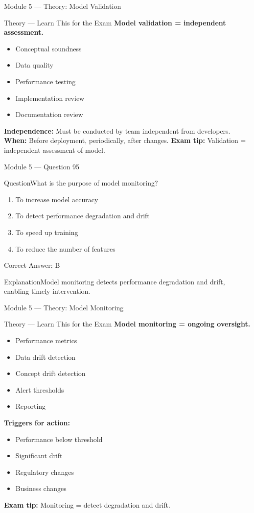 \documentclass[aspectratio=169,10pt]{beamer}
\newcommand{\question}[1]{\begin{block}{Question}#1\end{block}}
\newcommand{\options}[4]{%
	\begin{enumerate}[label=\Alph*.,leftmargin=*]
		\item #1
		\item #2
		\item #3
		\item #4
	\end{enumerate}
}
\newcommand{\answerbox}[1]{\begin{exampleblock}{Correct Answer: #1}\end{exampleblock}}
\newcommand{\explain}[1]{\begin{block}{Explanation}#1\end{block}}
\newcommand{\theory}[1]{%
	\begin{block}{Theory --- Learn This for the Exam}
		\small #1
	\end{block}
}
\begin{document}
	\begin{frame}{Module 5 --- Theory: Model Validation}
		\theory{
			\textbf{Model validation = independent assessment.}
			\begin{itemize}
				\item Conceptual soundness
				\item Data quality
				\item Performance testing
				\item Implementation review
				\item Documentation review
			\end{itemize}
			\textbf{Independence:} Must be conducted by team independent from developers.
			\textbf{When:} Before deployment, periodically, after changes.
			\textbf{Exam tip:} Validation = independent assessment of model.
		}
	\end{frame}
	
	\begin{frame}{Module 5 --- Question 95}
		\question{What is the purpose of model monitoring?}
		\options{To increase model accuracy}{To detect performance degradation and drift}{To speed up training}{To reduce the number of features}
		\answerbox{B}
		\explain{Model monitoring detects performance degradation and drift, enabling timely intervention.}
	\end{frame}
	
	\begin{frame}{Module 5 --- Theory: Model Monitoring}
		\theory{
			\textbf{Model monitoring = ongoing oversight.}
			\begin{itemize}
				\item Performance metrics
				\item Data drift detection
				\item Concept drift detection
				\item Alert thresholds
				\item Reporting
			\end{itemize}
			\textbf{Triggers for action:}
			\begin{itemize}
				\item Performance below threshold
				\item Significant drift
				\item Regulatory changes
				\item Business changes
			\end{itemize}
			\textbf{Exam tip:} Monitoring = detect degradation and drift.
		}
	\end{frame}
	
\end{document}
